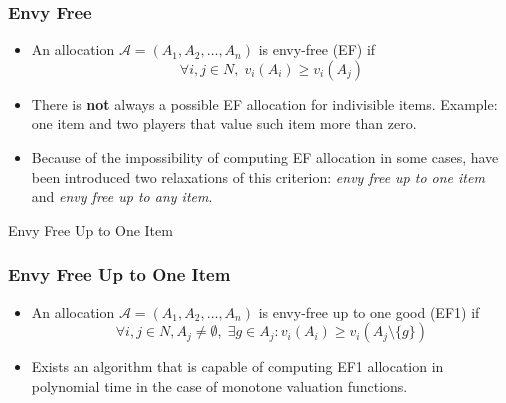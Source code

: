 \begin{frame}
\frametitle{Envy Free}
\begin{itemize}
    \item An allocation $\mathcal{A} = (A_1, A_2, \dots, A_n)$ is envy-free (EF) if 
$$\forall i,j\in N, \; v_i(A_i)\ge v_i(A_j)$$
    
    \item There is \textbf{not} always a possible EF allocation for indivisible items. Example: one item and two players that value such item more than zero.
    
    \item Because of the impossibility of computing EF allocation in some cases, have been introduced two relaxations of this criterion: \textit{envy free up to one item} and \textit{envy free up to any item}. 

\end{itemize}
\end{frame}


\begin{frame}{Envy Free Up to One Item}
\frametitle{Envy Free Up to One Item}
\begin{itemize}
    \item An allocation $\mathcal{A} = (A_1, A_2, \dots, A_n)$ is envy-free up to one good (EF1) if
$$\forall i,j\in N, A_j\ne \emptyset, \; \exists g\in A_j: v_i(A_i)\ge v_i(A_j\setminus \{g\})$$

    \item Exists an algorithm that is capable of computing EF1 allocation in polynomial time in the case of monotone valuation functions.
    
\end{itemize}

\end{frame}


